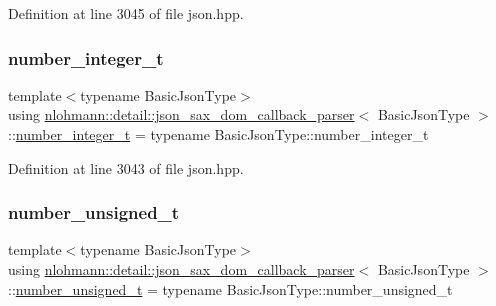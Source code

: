 Definition at line 3045 of file json.\+hpp.

\mbox{\label{classnlohmann_1_1detail_1_1json__sax__dom__callback__parser_a3ba8fc7a8d83c5b0eeb3b543ad844b8d}} 
\subsubsection{\texorpdfstring{number\_integer\_t}{number\_integer\_t}}
{\footnotesize\ttfamily template$<$typename Basic\+Json\+Type$>$ \\
using \mbox{\hyperlink{classnlohmann_1_1detail_1_1json__sax__dom__callback__parser}{nlohmann\+::detail\+::json\+\_\+sax\+\_\+dom\+\_\+callback\+\_\+parser}}$<$ Basic\+Json\+Type $>$\+::\mbox{\hyperlink{classnlohmann_1_1detail_1_1json__sax__dom__callback__parser_a3ba8fc7a8d83c5b0eeb3b543ad844b8d}{number\+\_\+integer\+\_\+t}} =  typename Basic\+Json\+Type\+::number\+\_\+integer\+\_\+t}



Definition at line 3043 of file json.\+hpp.

\mbox{\label{classnlohmann_1_1detail_1_1json__sax__dom__callback__parser_a2406c5125f7128fb9c01921df2903001}} 
\subsubsection{\texorpdfstring{number\_unsigned\_t}{number\_unsigned\_t}}
{\footnotesize\ttfamily template$<$typename Basic\+Json\+Type$>$ \\
using \mbox{\hyperlink{classnlohmann_1_1detail_1_1json__sax__dom__callback__parser}{nlohmann\+::detail\+::json\+\_\+sax\+\_\+dom\+\_\+callback\+\_\+parser}}$<$ Basic\+Json\+Type $>$\+::\mbox{\hyperlink{classnlohmann_1_1detail_1_1json__sax__dom__callback__parser_a2406c5125f7128fb9c01921df2903001}{number\+\_\+unsigned\+\_\+t}} =  typename Basic\+Json\+Type\+::number\+\_\+unsigned\+\_\+t}



